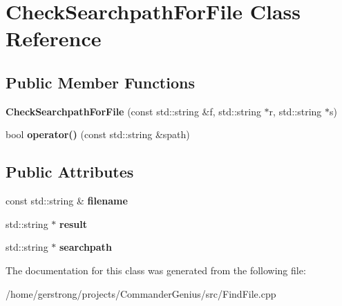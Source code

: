 \hypertarget{class_check_searchpath_for_file}{
\section{CheckSearchpathForFile Class Reference}
\label{class_check_searchpath_for_file}
}
\subsection*{Public Member Functions}
\begin{DoxyCompactItemize}
\item 
\hypertarget{class_check_searchpath_for_file_a6e5527bfcd5921570ee4e7083a85662f}{
{\bfseries CheckSearchpathForFile} (const std::string \&f, std::string $\ast$r, std::string $\ast$s)}
\label{class_check_searchpath_for_file_a6e5527bfcd5921570ee4e7083a85662f}

\item 
\hypertarget{class_check_searchpath_for_file_a3cc3c33b712b1e99c3e8bf83df415066}{
bool {\bfseries operator()} (const std::string \&spath)}
\label{class_check_searchpath_for_file_a3cc3c33b712b1e99c3e8bf83df415066}

\end{DoxyCompactItemize}
\subsection*{Public Attributes}
\begin{DoxyCompactItemize}
\item 
\hypertarget{class_check_searchpath_for_file_a0f0d32f367d9ac6242387209a1119c22}{
const std::string \& {\bfseries filename}}
\label{class_check_searchpath_for_file_a0f0d32f367d9ac6242387209a1119c22}

\item 
\hypertarget{class_check_searchpath_for_file_aa0811a7309c8ef72a00fb1fdafde3164}{
std::string $\ast$ {\bfseries result}}
\label{class_check_searchpath_for_file_aa0811a7309c8ef72a00fb1fdafde3164}

\item 
\hypertarget{class_check_searchpath_for_file_a7495522658030298ceb01c3b818ffd84}{
std::string $\ast$ {\bfseries searchpath}}
\label{class_check_searchpath_for_file_a7495522658030298ceb01c3b818ffd84}

\end{DoxyCompactItemize}


The documentation for this class was generated from the following file:\begin{DoxyCompactItemize}
\item 
/home/gerstrong/projects/CommanderGenius/src/FindFile.cpp\end{DoxyCompactItemize}

